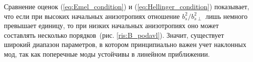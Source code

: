 Сравнение оценок (\ref{eq:Emel_condition}) и (\ref{eq:Hellinger_condition}) показывает, что если при высоких начальных анизотропиях отношение $ b_{s}^2/ b_{s\perp}^2$ лишь немного превышает единицу, то при низких начальных анизотропиях оно может составлять несколько порядков~(рис. \ref{ris:B_podavl}). Значит, существует широкий диапазон параметров, в котором принципиально важен учет наклонных мод, так как поперечные моды устойчивы в линейном приближении.

